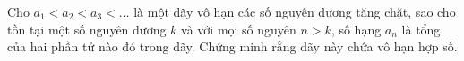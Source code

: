 \ifshowproblem
\begin{problem}\label{problem:BGR-2015-EGMO-TST-P1}
	Cho $a_1 < a_2 < a_3 < \ldots$ là một dãy vô hạn các số nguyên dương tăng chặt,
	sao cho tồn tại một số nguyên dương $k$ và với mọi số nguyên $n > k$, số hạng $a_n$ là tổng của hai phần tử nào đó trong dãy.
	Chứng minh rằng dãy này chứa vô hạn hợp số.
\end{problem}
\fi

\footnotemark
{}
\fi